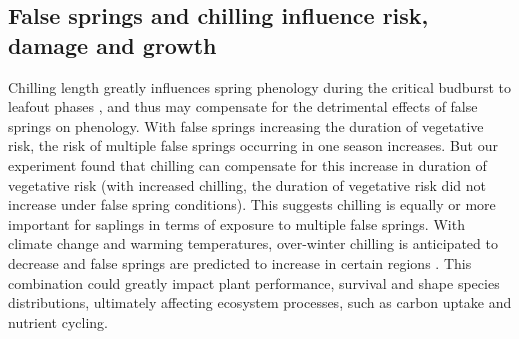 \documentclass{article}\usepackage[]{graphicx}\usepackage[]{color}
\begin{document}
\begin{enumerate}
\subsection*{False springs and chilling influence risk, damage and growth} 
Chilling length greatly influences spring phenology during the critical budburst to leafout phases \citep{Chuine2001, Laube2014}, and thus may compensate for the detrimental effects of false springs on phenology. With false springs increasing the duration of vegetative risk, the risk of multiple false springs occurring in one season increases. But our experiment found that chilling can compensate for this increase in duration of vegetative risk (with increased chilling, the duration of vegetative risk did not increase under false spring conditions). This suggests chilling is equally or more important for saplings in terms of exposure to multiple false springs. With climate change and warming temperatures, over-winter chilling is anticipated to decrease \citep{Laube2014} and false springs are predicted to increase in certain regions \citep{Ault2015, Liu2018}. This combination could greatly impact plant performance, survival and shape species distributions, ultimately affecting ecosystem processes, such as carbon uptake and nutrient cycling.
 

\end{enumerate}
\end{document}
